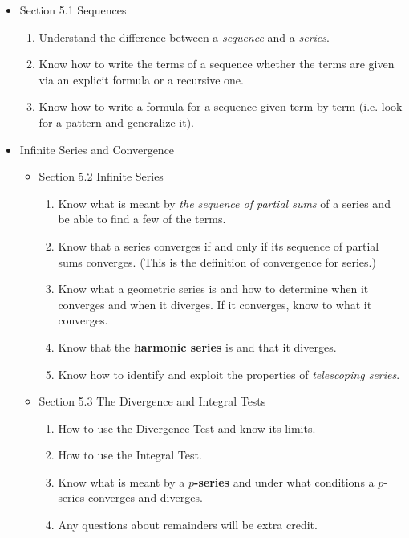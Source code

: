 \documentclass[11pt,fleqn]{article}
\begin{document}
\begin{itemize}
\item Section 5.1 Sequences\\

	\begin{enumerate}
	\item Understand the difference between a \emph{sequence} and a \emph{series}. 
	\item Know how to write the terms of a sequence whether the terms are given via an explicit formula or a recursive one. 
	\item Know how to write a formula for a sequence given term-by-term (i.e. look for a pattern and  generalize it).\\
	\end{enumerate}
	
\item Infinite Series and Convergence
	\begin{itemize}
	\item Section 5.2 Infinite Series\\
		\begin{enumerate}
		\item Know what is meant by \emph{the sequence of partial sums} of a series and be able to find a few of the terms.
		\item Know that a series converges if and only if its sequence of partial sums converges. (This is the definition of convergence for series.)
		\item Know what a geometric series is and how to determine when it converges and when it diverges. If it converges, know to what it converges. 
		\item Know that the \textbf{harmonic series} is and that it diverges.
		\item Know how to identify and exploit the properties of \emph{telescoping series}.
		\end{enumerate}

	\item Section 5.3 The Divergence and Integral Tests\\

		\begin{enumerate}
		\item How to use the Divergence Test and know its limits.
		\item How to use the Integral Test.
		\item Know what is meant by a \textbf{$p$-series} and under what conditions a $p$-series converges and diverges.
		\item Any questions about remainders will be extra credit.
		\end{enumerate}


\end{itemize}
\end{itemize}
\end{document}
